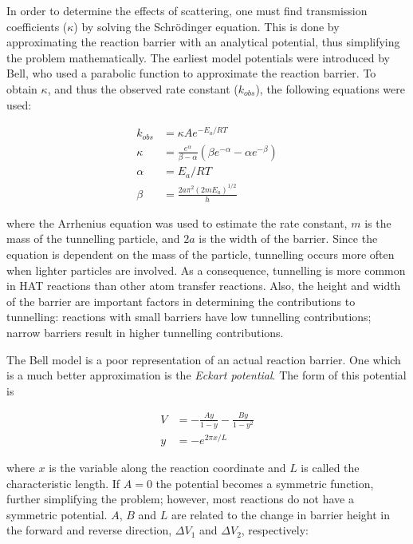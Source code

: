 In order to determine the effects of scattering, one must find transmission coefficients ($\kappa$) by solving the Schr{\"o}dinger equation.\cite{Griffiths2016} This is done by approximating the reaction barrier with an analytical potential, thus simplifying the problem mathematically. The earliest model potentials were introduced by Bell, who used a parabolic function to approximate the reaction barrier.\cite{Bell1980} To obtain $\kappa$, and thus the observed rate constant ($k_{obs}$), the following equations were used:

\begin{align}
  k_{obs} &= \kappa A e^{-E_a/RT}  \\
\kappa &= \frac{e^\alpha}{\beta-\alpha} \left(\beta e^{-\alpha} - \alpha
  e^{-\beta} \right) \\
  \alpha &= E_a/RT \\
  \beta &= \frac{2a\pi^2(2mE_a)^{1/2}}{h}
\end{align}

\noindent where the Arrhenius equation was used to estimate the rate constant, $m$ is the mass of the tunnelling particle, and $2a$ is the width of the barrier. Since the equation is dependent on the mass of the particle, tunnelling occurs more often when lighter particles are involved. As a consequence, tunnelling is more common in HAT reactions than other atom transfer reactions. Also, the height and width of the barrier are important factors in determining the contributions to tunnelling: reactions with small barriers have low tunnelling contributions; narrow barriers result in higher tunnelling contributions.

The Bell model is a poor representation of an actual reaction barrier. One which is a much better approximation is the \emph{Eckart potential}.\cite{Johnston1962} The form of this potential is

\begin{align}
  V &= -\frac{Ay}{1-y} - \frac{By}{1-y^2} \\
  y &= -e^{2\pi x/L}
\end{align}

\noindent where $x$ is the variable along the reaction coordinate and $L$ is called the characteristic length. If $A=0$ the potential becomes a symmetric function, further simplifying the problem; however, most reactions do not have a symmetric potential. $A$, $B$ and $L$ are related to the change in barrier height in the forward and reverse direction, $\Delta V_1$ and $\Delta V_2$, respectively:

